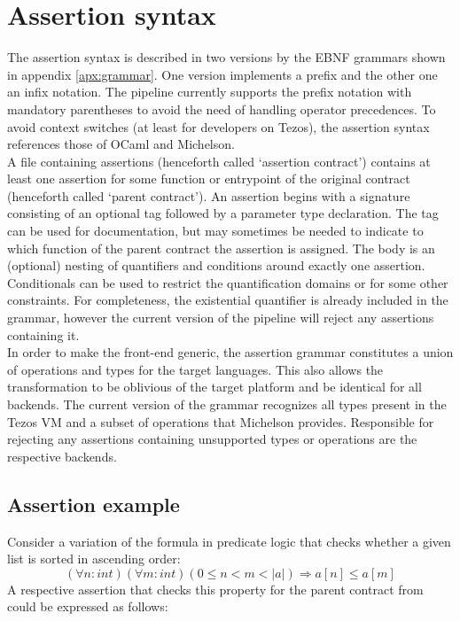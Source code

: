 \section{Assertion syntax}
The assertion syntax is described in two versions by the EBNF grammars shown in appendix \ref{apx:grammar}. One version implements a prefix and the other one an infix notation. The pipeline currently supports the prefix notation with mandatory parentheses to avoid the need of handling operator precedences. To avoid context switches (at least for developers on Tezos), the assertion syntax references those of OCaml and Michelson.\\
A file containing assertions (henceforth called `assertion contract') contains at least one assertion for some function or entrypoint of the original contract (henceforth called `parent contract'). An assertion begins with a signature consisting of an optional tag followed by a parameter type declaration. The tag can be used for documentation, but may sometimes be needed to indicate to which function of the parent contract the assertion is assigned. The body is an (optional) nesting of quantifiers and conditions around exactly one assertion. Conditionals can be used to restrict the quantification domains or for some other constraints. For completeness, the existential quantifier is already included in the grammar, however the current version of the pipeline will reject any assertions containing it.\\
In order to make the front-end generic, the assertion grammar constitutes a union of operations and types for the target languages. This also allows the transformation to be oblivious of the target platform and be identical for all backends. The current version of the grammar recognizes all types present in the Tezos VM and a subset of operations that Michelson provides. Responsible for rejecting any assertions containing unsupported types or operations are the respective backends.

\subsection{Assertion example}
Consider a variation of the formula in predicate logic that checks whether a given list is sorted in ascending order:
\begin{equation}\label{eq:sorted_v2}
	(\forall n : int)(\forall m : int) (0 \leq n < m < |a|) \Rightarrow a[n] \leq a[m]
\end{equation}
A respective assertion that checks this property for the parent contract from  could be expressed as follows:


